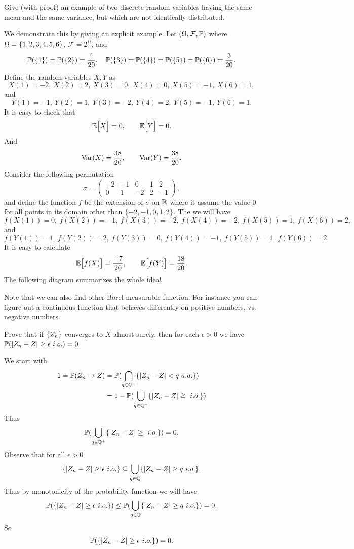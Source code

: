 \begin{problem}
	Give (with proof) an example of two discrete random variables having the same mean and the same variance, but which are not identically distributed.
\end{problem}
\begin{solution}
	We demonstrate this by giving an explicit example. Let $ (\Omega,\mathcal{F},\mathbb{P}) $ where $ \Omega = \{1,2,3,4,5,6\} $, $ \mathcal{F} = 2^\Omega $, and
	\[ \mathbb{P}(\{1\})=\mathbb{P}(\{2\})=\frac{4}{20},\quad \mathbb{P}(\{3\})=\mathbb{P}(\{4\})=\mathbb{P}(\{5\})=\mathbb{P}(\{6\})=\frac{3}{20}. \]
	Define the random variables $ X,Y $ as
	\[ X(1)=-2,\ X(2)=2,\ X(3)=0,\ X(4)=0,\ X(5)=-1,\ X(6)=1, \]
	and
	\[ Y(1)=-1,\ Y(2)=1,\ Y(3)=-2,\ Y(4)=2,\ Y(5)=-1,\ Y(6)=1. \]
	It is easy to check that
	\[ \mathbb{E}\big[X\big] = 0, \qquad \mathbb{E}\big[Y\big] = 0. \]
	And
	\[ \operatorname{Var}(X) = \frac{38}{20},\qquad \operatorname{Var}(Y) = \frac{38}{20}. \]
	Consider the following permutation
	\[ 
	\sigma = \begin{pmatrix}
		-2 & -1 & 0 & 1 & 2 \\
		0 & 1 & -2 & 2 & -1
	\end{pmatrix},
	 \]
	 and define the function $ f $ be the extension of $ \sigma $ on $ \mathbb{R} $ where it assume the value 0 for all points in its domain other than $ \{-2,-1,0,1,2\} $. The we will have
	 \[ f(X(1))=0,\ f(X(2))=-1,\ f(X(3))=-2,\ f(X(4))=-2,\ f(X(5))=1,\ f(X(6))=2, \]
	 and
	 \[ f(Y(1))=1,\ f(Y(2))=2,\ f(Y(3))=0,\ f(Y(4))=-1,\ f(Y(5))=1,\ f(Y(6))=2. \]
	 It is easy to calculate
	 \[ \mathbb{E}\big[f(X)\big] = \frac{-7}{20},\qquad \mathbb{E}\big[f(Y)\big] = \frac{18}{20}. \]
	 The following diagram summarizes the whole idea!
	 
	 Note that we can also find other Borel measurable function. For instance you can figure out a continuous function that behaves differently on positive numbers, vs. negative numbers.
\end{solution}

\begin{problem}
	Prove that if $ \{Z_n\} $ converges to $ X $ almost surely, then for each $ \epsilon>0 $ we have $ \prob(\abs{Z_n - Z}\geq \epsilon\ i.o.) = 0 $.
\end{problem}
\begin{solution}
	We start with
	\begin{align*}
		1 = \mathbb{P}(Z_n\to Z) &= \mathbb{P}(\bigcap_{q\in\mathbb{Q}^+}\{|Z_n-Z|<q\ a.a.\}) \\
		&= 1 - \mathbb{P}(\bigcup_{q\in\mathbb{Q}^+}\{|Z_n-Z|\geqq\ i.o.\})
	\end{align*}
	Thus
	\[ \prob(\bigcup_{q\in\Q^+}\set{\abs{Z_n-Z}\geq\ i.o.}) = 0. \]
	Observe that for all $ \epsilon>0 $
	\[ \{|Z_n-Z|\geq\epsilon\ i.o.\} \subseteq \bigcup_{q\in\mathbb{Q}}\{|Z_n-Z|\geq q\ i.o.\}. \]
	Thus by monotonicity of the probability function we will have
	\[ \mathbb{P}(\{|Z_n-Z|\geq\epsilon\ i.o.\}) \leq \mathbb{P}(\bigcup_{q\in\mathbb{Q}}\{|Z_n-Z|\geq q\ i.o.\}) = 0. \]
	So
	\[  \mathbb{P}(\{|Z_n-Z|\geq\epsilon\ i.o.\}) = 0. \]
\end{solution}


